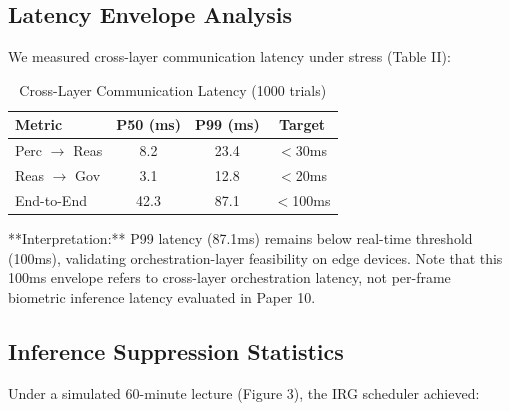 \documentclass[conference]{IEEEtran}
\begin{document}
\begin{center}
\end{center}

\subsection{Latency Envelope Analysis}
We measured cross-layer communication latency under stress (Table II):

\begin{table}[htbp]
\caption{Cross-Layer Communication Latency (1000 trials)}
\begin{center}
\begin{tabular}{lccc}
\toprule
\textbf{Metric} & \textbf{P50 (ms)} & \textbf{P99 (ms)} & \textbf{Target} \\
\midrule
Perc $\to$ Reas & 8.2 & 23.4 & $<$30ms \\
Reas $\to$ Gov & 3.1 & 12.8 & $<$20ms \\
End-to-End & 42.3 & 87.1 & $<$100ms \\
\bottomrule
\end{tabular}
\end{center}
\end{table}

**Interpretation:** P99 latency (87.1ms) remains below real-time threshold (100ms), validating orchestration-layer feasibility on edge devices. Note that this 100ms envelope refers to cross-layer orchestration latency, not per-frame biometric inference latency evaluated in Paper 10.

\subsection{Inference Suppression Statistics}
Under a simulated 60-minute lecture (Figure 3), the IRG scheduler achieved:
\end{document}
